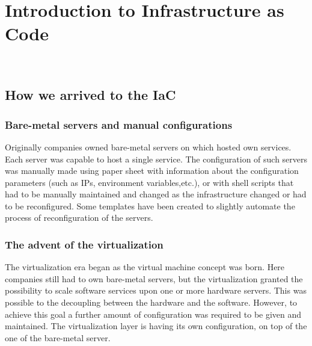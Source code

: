 
\chapter{Introduction to Infrastructure as Code}
\label{cap:introduction-to-iac}

\\



\section{How we arrived to the IaC}
\label{sec:story-iac}

\subsection{Bare-metal servers and manual configurations}
Originally companies owned bare-metal servers on which hosted own services.
Each server was capable to host a single service.
The configuration of such servers was manually made using paper sheet with information about the configuration parameters (such as IPs, environment variables,etc.), or with shell scripts that had to be manually maintained and changed as the infrastructure changed or had to be reconfigured.
Some templates have been created to slightly automate the process of reconfiguration of the servers.\\

\subsection{The advent of the virtualization}
The virtualization era began as the virtual machine concept was born.
Here companies still had to own bare-metal servers, but the virtualization granted the possibility to scale software services upon one or more hardware servers.
This was possible to the decoupling between the hardware and the software.
However, to achieve this goal a further amount of configuration was required to be given and maintained.
The virtualization layer is having its own configuration, on top of the one of the bare-metal server.\\

